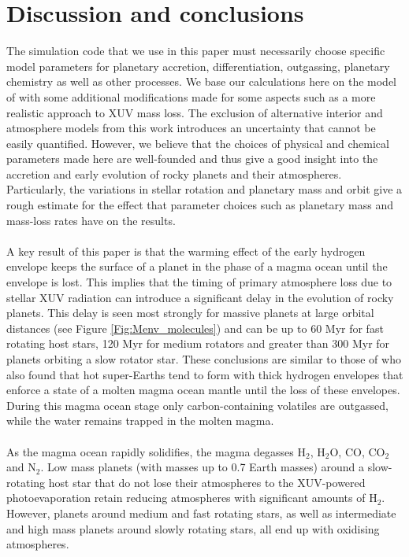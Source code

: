 \documentclass[bibyear,tradiabstract]{aa}
\begin{document}
\section{Discussion and conclusions}


\noindent 
The simulation code that we use in this paper must necessarily choose specific model parameters for planetary accretion, differentiation, outgassing, planetary chemistry as well as other processes. We base our calculations here on the model of \cite{Johansen+2023I} with some additional modifications made for some aspects such as a more realistic approach to XUV mass loss. The exclusion of alternative interior and atmosphere models from this work introduces an uncertainty that cannot be easily quantified. However, we believe that the choices of physical and chemical parameters made here are well-founded and thus give a good insight into the accretion and early evolution of rocky planets and their atmospheres. Particularly, the variations in stellar rotation and planetary mass and orbit give a rough estimate for the effect that parameter choices such as planetary mass and mass-loss rates have on the results.\\
\\
A key result of this paper is that the warming effect of the early hydrogen envelope keeps the surface of a planet in the phase of a magma ocean until the envelope is lost. This implies that the timing of primary atmosphere loss {due to stellar XUV radiation} can introduce a significant delay in the evolution of rocky planets. This delay is seen most strongly for massive planets at large orbital distances (see Figure \ref{Fig:Menv_molecules}) and can be up to 60 Myr for fast rotating host stars, 120 Myr for medium rotators and greater than 300 Myr for planets orbiting a slow rotator star. These conclusions are similar to those of \cite{Kite+Barnett2020} who also found that hot super-Earths tend to form with thick hydrogen envelopes that enforce a state of a molten magma ocean mantle until the loss of these envelopes. {During this magma ocean stage only carbon-containing volatiles are outgassed, while the water remains trapped in the molten magma.}\\
\\
As the magma ocean {rapidly} solidifies, the magma degasses H$_2$, H$_2$O, CO, CO$_2$ and N$_2$. Low mass planets (with masses up to 0.7 Earth masses) around a slow-rotating host star that do not lose their atmospheres to the XUV-powered photoevaporation retain reducing atmospheres with significant amounts of H$_2$. However,  planets around medium and fast rotating stars, as well as intermediate and high mass planets around slowly rotating stars, all end up with oxidising atmospheres. \\
\end{document}
